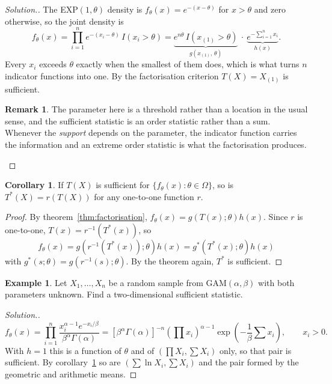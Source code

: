 \documentclass[12pt,a4paper]{report}
\theoremstyle{definition}
\newtheorem{exa}[thm]{Example}
\newtheorem{coro}[thm]{Corollary}
\newtheorem*{remark}{Remark}
\newenvironment{solution}
  {\renewcommand{\qedsymbol}{}\begin{proof}[\textit{Solution}.]}
  {\end{proof}}
\begin{document}
\begin{solution}
The EXP$(1,\theta)$ density is $f_{\theta}(x)=e^{-(x-\theta)}$ for $x>\theta$
and zero otherwise, so the joint density is
\[f_{\theta}(x) = \prod_{i=1}^{n} e^{-(x_i-\theta)}\,I\left(x_i>\theta\right)
= \underbrace{e^{n\theta}\,I\left(x_{(1)}>\theta\right)}_{g\left(x_{(1)},\,\theta\right)}\ \cdot\
\underbrace{e^{-\sum_{i=1}^{n}x_i}}_{h(x)} .\]
Every $x_i$ exceeds $\theta$ exactly when the smallest of them does, which is
what turns $n$ indicator functions into one. By the factorisation criterion
$T(X)=X_{(1)}$ is sufficient.

\begin{remark}
The parameter here is a threshold rather than a location in the usual sense, and
the sufficient statistic is an order statistic rather than a sum. Whenever the
\emph{support} depends on the parameter, the indicator function carries the
information and an extreme order statistic is what the factorisation produces.
\end{remark}
\end{solution}

\begin{coro}
\label{cor:onetoone}
If $T(X)$ is sufficient for $\{f_\theta(x) : \theta\in\Omega\}$, so is
$T^*(X) = r(T(X))$ for any one-to-one function $r$.
\end{coro}

\begin{proof}
By theorem~\ref{thm:factorisation}, $f_\theta(x) = g(T(x);\theta)h(x)$. Since $r$ is
one-to-one, $T(x) = r^{-1}(T^*(x))$, so
\[f_\theta(x) = g\left(r^{-1}(T^*(x));\theta\right)h(x) = g^*\left(T^*(x);\theta\right)h(x)\]
with $g^*(s;\theta) = g(r^{-1}(s);\theta)$. By the theorem again, $T^*$ is
sufficient.
\end{proof}

\begin{exa}
\label{ex:gammasufficient}
Let $X_1, \dots, X_n$ be a random sample from $\text{GAM}(\alpha, \beta)$ with
both parameters unknown. Find a two-dimensional sufficient statistic.
\end{exa}

\begin{solution}
\[f_\theta(x) = \prod_{i=1}^n\frac{x_i^{\alpha - 1}e^{-x_i/\beta}}{\beta^\alpha\Gamma(\alpha)}
= \left[\beta^\alpha\Gamma(\alpha)\right]^{-n}\left(\prod x_i\right)^{\alpha - 1}\exp\left(-\frac{1}{\beta}\sum x_i\right),\qquad x_i>0 .\]
With $h = 1$ this is a function of $\theta$ and of $\left(\prod X_i, \sum X_i\right)$
only, so that pair is sufficient. By corollary~\ref{cor:onetoone} so are
$\left(\sum\ln X_i, \sum X_i\right)$ and the pair formed by the geometric and
arithmetic means.
\end{solution}
\end{document}
